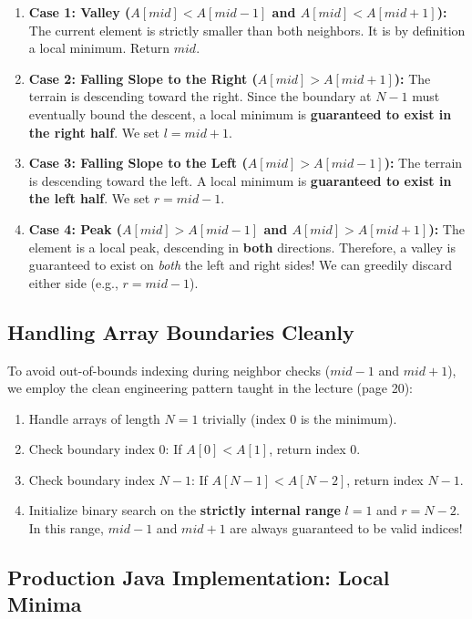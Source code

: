 \documentclass[10pt,journal,compsoc,onecolumn]{IEEEtran}
\begin{document}
\begin{enumerate}
    \item \textbf{Case 1: Valley ($A[mid] < A[mid - 1]$ and $A[mid] < A[mid + 1]$):} The current element is strictly smaller than both neighbors. It is by definition a local minimum. Return $mid$.
    \item \textbf{Case 2: Falling Slope to the Right ($A[mid] > A[mid + 1]$):} The terrain is descending toward the right. Since the boundary at $N - 1$ must eventually bound the descent, a local minimum is \textbf{guaranteed to exist in the right half}. We set $l = mid + 1$.
    \item \textbf{Case 3: Falling Slope to the Left ($A[mid] > A[mid - 1]$):} The terrain is descending toward the left. A local minimum is \textbf{guaranteed to exist in the left half}. We set $r = mid - 1$.
    \item \textbf{Case 4: Peak ($A[mid] > A[mid - 1]$ and $A[mid] > A[mid + 1]$):} The element is a local peak, descending in \textbf{both} directions. Therefore, a valley is guaranteed to exist on \emph{both} the left and right sides! We can greedily discard either side (e.g., $r = mid - 1$).
\end{enumerate}

\subsection{Handling Array Boundaries Cleanly}

To avoid out-of-bounds indexing during neighbor checks ($mid - 1$ and $mid + 1$), we employ the clean engineering pattern taught in the lecture (page 20):
\begin{enumerate}
    \item Handle arrays of length $N = 1$ trivially (index $0$ is the minimum).
    \item Check boundary index $0$: If $A[0] < A[1]$, return index $0$.
    \item Check boundary index $N - 1$: If $A[N - 1] < A[N - 2]$, return index $N - 1$.
    \item Initialize binary search on the \textbf{strictly internal range} $l = 1$ and $r = N - 2$. In this range, $mid - 1$ and $mid + 1$ are always guaranteed to be valid indices!
\end{enumerate}

\subsection{Production Java Implementation: Local Minima}
\end{document}
